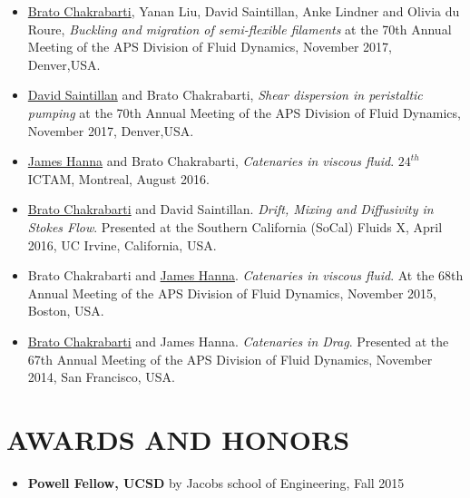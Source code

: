 \documentclass[10pt]{res} %
\begin{document}
\begin{resume}
\begin{itemize}
	\item \underline{Brato Chakrabarti}, Yanan Liu, David Saintillan, Anke Lindner and Olivia du Roure, \textit{Buckling and migration of semi-flexible filaments} at the 70th Annual Meeting of the APS Division of Fluid Dynamics, November 2017,
	Denver,USA. 
	
	\item \underline{David Saintillan} and Brato Chakrabarti, \textit{Shear dispersion in peristaltic pumping} at the 70th Annual Meeting of the APS Division of Fluid Dynamics, November 2017,
		Denver,USA. 
	
	\item \underline{James Hanna} and Brato Chakrabarti, \textit{Catenaries in viscous fluid}. $24^{th}$ ICTAM, Montreal, August 2016.
	
	\item \underline{Brato Chakrabarti} and David Saintillan. \textit{Drift, Mixing and Diffusivity in 
		Stokes Flow}. Presented at the Southern California (SoCal) Fluids X, April 2016, UC Irvine, California, USA.
	
	\item Brato Chakrabarti and \underline{James Hanna}. \textit{Catenaries in viscous fluid}. At the 68th Annual Meeting of the APS Division of Fluid Dynamics, November 2015,
	Boston, USA. 
	
	\item \underline{Brato Chakrabarti} and James Hanna. \textit{Catenaries in Drag}. Presented at the 67th Annual Meeting of the APS Division of Fluid Dynamics, November 2014,
	San Francisco, USA. 
	
	
\end{itemize}

\vspace*{-0.15cm}
\section{{AWARDS AND HONORS}}
\vspace*{6mm}
	\begin{itemize}
		\item \textbf{Powell Fellow, UCSD} by Jacobs school of Engineering, Fall 2015
		

\end{itemize}
\end{resume}
\end{document}
